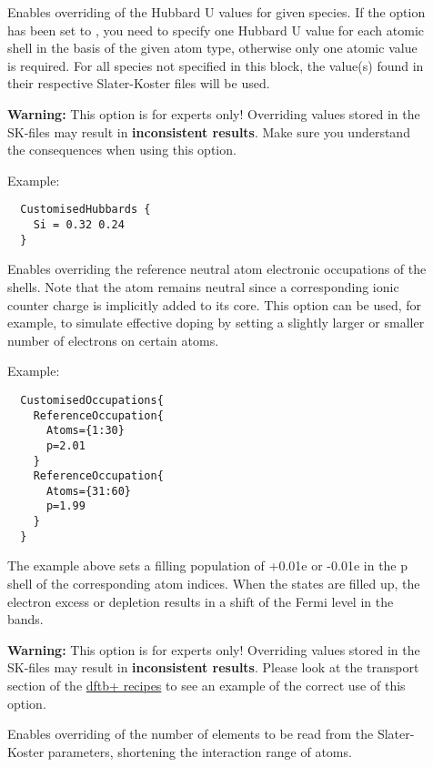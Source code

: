 \begin{description}
\item[] Enables overriding of the Hubbard U values for given species. If the
  option  has been set to , you need to specify one Hubbard U value
  for each atomic shell in the basis of the given atom type, otherwise only one atomic value is
  required. For all species not specified in this block, the value(s) found in their respective
  Slater-Koster files will be used.

  \textbf{Warning:} This option is for experts only! Overriding values stored in the SK-files may
  result in \textbf{inconsistent results}. Make sure you understand the consequences when using this
  option.

  Example:
  \begin{verbatim}
  CustomisedHubbards {
    Si = 0.32 0.24
  }
  \end{verbatim}

\item[] Enables overriding the reference neutral atom
  electronic occupations of the shells. Note that the atom remains neutral since
  a corresponding ionic counter charge is implicitly added to its core. This
  option can be used, for example, to simulate effective doping by setting a
  slightly larger or smaller number of electrons on certain atoms.

  Example:
  \begin{verbatim}
  CustomisedOccupations{
    ReferenceOccupation{
      Atoms={1:30}
      p=2.01
    }
    ReferenceOccupation{
      Atoms={31:60}
      p=1.99
    }
  }
  \end{verbatim}

  The example above sets a filling population of +0.01e or -0.01e in the p shell
  of the corresponding atom indices. When the states are filled up, the electron
  excess or depletion results in a shift of the Fermi level in the bands.

  \textbf{Warning:} This option is for experts only! Overriding values stored in
  the SK-files may result in \textbf{inconsistent results}. Please look at the
  transport section of the
  \href{https://dftbplus-recipes.readthedocs.io/en/latest/}{dftb+ recipes} to
  see an example of the correct use of this option.

\item[] Enables overriding of the number of elements to be
  read from the Slater-Koster parameters, shortening the interaction range of
  atoms.


\end{description}
